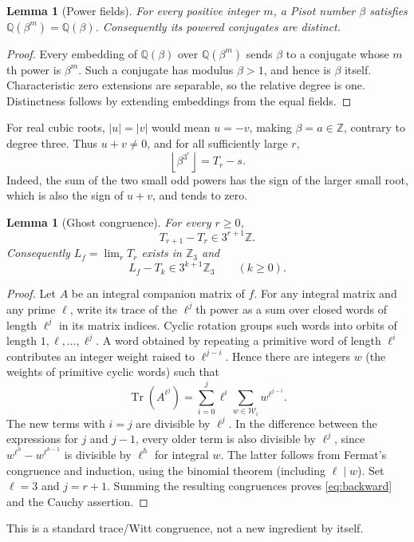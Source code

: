 \documentclass[11pt,a4paper]{article}
\newtheorem{lemma}[theorem]{Lemma}
\theoremstyle{definition}\newtheorem{definition}[theorem]{Definition}
\theoremstyle{remark}\newtheorem{remark}[theorem]{Remark}
\newcommand{\Q}{\mathbb Q}\newcommand{\Z}{\mathbb Z}\newcommand{\N}{\mathbb N}\newcommand{\R}{\mathbb R}\newcommand{\C}{\mathbb C}
\DeclareMathOperator{\Tr}{Tr}\DeclareMathOperator{\Norm}{N}\DeclareMathOperator{\trdeg}{trdeg}\DeclareMathOperator{\ord}{ord}\DeclareMathOperator{\lcm}{lcm}
\newcommand{\floor}[1]{\left\lfloor #1\right\rfloor}\newcommand{\ceil}[1]{\left\lceil #1\right\rceil}
\begin{document}
\begin{lemma}[Power fields]\label{lem:power-degree}
For every positive integer $m$, a Pisot number $\beta$ satisfies $\Q(\beta^m)=\Q(\beta)$. Consequently its powered conjugates are distinct.
\end{lemma}
\begin{proof}
Every embedding of $\Q(\beta)$ over $\Q(\beta^m)$ sends $\beta$ to a conjugate whose $m$th power is $\beta^m$. Such a conjugate has modulus $\beta>1$, and hence is $\beta$ itself. Characteristic zero extensions are separable, so the relative degree is one. Distinctness follows by extending embeddings from the equal fields.
\end{proof}
For real cubic roots, $|u|=|v|$ would mean $u=-v$, making $\beta=a\in\Z$, contrary to degree three. Thus $u+v\ne0$, and for all sufficiently large $r$,
\begin{equation}\label{eq:floorreal}
 \floor{\beta^{3^r}}=T_r-s.
\end{equation}
Indeed, the sum of the two small odd powers has the sign of the larger small root, which is also the sign of $u+v$, and tends to zero.

\begin{lemma}[Ghost congruence]\label{lem:ghost}
For every $r\ge0$,
\begin{equation}\label{eq:ghost}
 T_{r+1}-T_r\in3^{r+1}\Z.
\end{equation}
Consequently $L_f=\lim_r T_r$ exists in $\Z_3$ and
\begin{equation}\label{eq:backward}
 L_f-T_k\in3^{k+1}\Z_3\qquad(k\ge0).
\end{equation}
\end{lemma}
\begin{proof}
Let $A$ be an integral companion matrix of $f$. For any integral matrix and any prime $\ell$, write its trace of the $\ell^j$th power as a sum over closed words of length $\ell^j$ in its matrix indices. Cyclic rotation groups such words into orbits of length $1,\ell,\ldots,\ell^j$. A word obtained by repeating a primitive word of length $\ell^i$ contributes an integer weight raised to $\ell^{j-i}$. Hence there are integers $w$ (the weights of primitive cyclic words) such that
\[
 \Tr(A^{\ell^j})=\sum_{i=0}^j\ell^i\sum_{w\in\mathcal W_i}w^{\ell^{j-i}}.
\]
The new terms with $i=j$ are divisible by $\ell^j$. In the difference between the expressions for $j$ and $j-1$, every older term is also divisible by $\ell^j$, since
$w^{\ell^h}-w^{\ell^{h-1}}$ is divisible by $\ell^h$ for integral $w$. The latter follows from Fermat's congruence and induction, using the binomial theorem (including $\ell\mid w$). Set $\ell=3$ and $j=r+1$. Summing the resulting congruences proves \eqref{eq:backward} and the Cauchy assertion.
\end{proof}
This is a standard trace/Witt congruence, not a new ingredient by itself.
\end{document}
